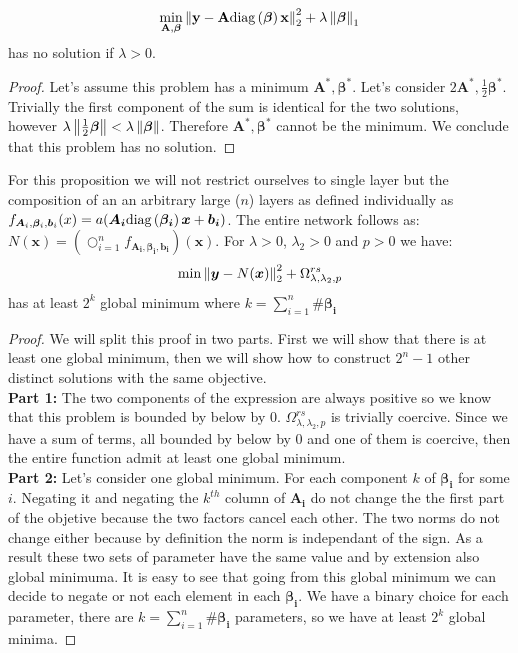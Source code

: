 \begin{proposition}
\label{unconstrained_shrinknet_no_min}
\begin{equation*}
     \min_{\bf{A}, \bm{\beta}} \left\lVert\bf{y} - \bf{A}\text{diag}\left(\bm{\beta}\right)\bf{x}\right\rVert_2^2 + \lambda \left\lVert\bm{\beta}\right\rVert_1
\end{equation*}
has no solution if $\lambda > 0$.
\end{proposition}
\begin{proof}
  Let's assume this problem has a minimum $\bm{A}^*, \bm{\beta}^*$. Let's consider $2\bm{A}^*, \frac{1}{2}\bm{\beta}^*$. Trivially the first component of the sum is identical for the two solutions, however $\lambda\left\lVert\frac{1}{2}\bm{\beta}\right\rVert < \lambda\left\lVert\bm{\beta}\right\rVert$. Therefore $\bm{A}^*, \bm{\beta}^*$ cannot be the minimum. We conclude that this problem has no solution.
\end{proof}
\begin{proposition}
  \label{shrinknet_regularized_minimum}
For this proposition we will not restrict ourselves to single layer but the composition of an an arbitrary large ($n$) layers as defined individually as $f_{\bm{A}_i, \bm{\beta}_i, \bm{b}_i}(x) = a(\bm{A_i}\text{diag}\left(\bm{\beta_i}\right)\bm{x} + \bm{b_i})$. The entire network follows as: $N(\bm{x}) = \left(\bigcirc_{i=1}^n f_{\bm{A_i}, \bm{\beta_i}, \bm{b_i}}\right)(\bm{x})$. For $\lambda > 0$, $\lambda_2 > 0$ and $p > 0$ we have:
  \begin{equation*}
    \min \left\lVert\bm{y} - N(\bm{x})\right\rVert_2^2 + \Omega_{\lambda, \lambda_2, p}^{rs}
  \end{equation*}
  has at least $2^k$ global minimum where $k = \sum_{i=1}^n \#\bm{\beta_i}$
\end{proposition}

\begin{proof}
  We will split this proof in two parts. First we will show that there is at least
  one global minimum, then we will show how to construct $2^n - 1$ other distinct
  solutions with the same objective.
\\ \textbf{Part 1:}
The two components of the expression are always positive so we know that this problem is bounded by below by $0$. $\Omega_{\lambda, \lambda_2, p}^{rs}$ is trivially coercive. Since we have a sum of terms, all bounded by below by $0$ and one of them is coercive, then the entire function admit at least one global minimum.
\\ \textbf{Part 2:} Let's consider one global minimum. For each component $k$ of $\bm{\beta_i}$ for some $i$. Negating it and negating the $k^{th}$ column of $\bm{A_i}$ do not change the the first part of the objetive because the two factors cancel each other. The two norms do not change either because by definition the norm is independant of the sign. As a result these two sets of parameter have the same value and by extension also global minimuma. It is easy to see that going from this global minimum we can decide to negate or not each element in each $\bm{\beta_i}$. We have a binary choice for each parameter, there are $k = \sum_{i=1}^n \#\bm{\beta_i}$ parameters, so we have at least $2^k$ global minima.

\end{proof}
